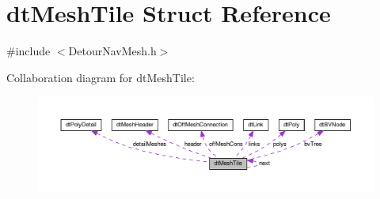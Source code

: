 \hypertarget{structdtMeshTile}{}\section{dt\+Mesh\+Tile Struct Reference}
\label{structdtMeshTile}


{\ttfamily \#include $<$Detour\+Nav\+Mesh.\+h$>$}



Collaboration diagram for dt\+Mesh\+Tile\+:
\nopagebreak
\begin{figure}[H]
\begin{center}
\leavevmode
\includegraphics[width=350pt]{structdtMeshTile__coll__graph}
\end{center}
\end{figure}
